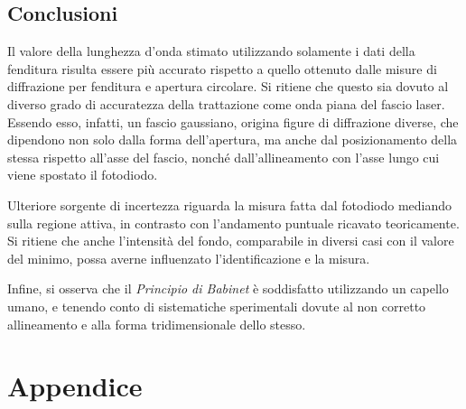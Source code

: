 \documentclass[10pt,oneside,a4paper]{article}
\begin{document}
\begin{multicols}{2}
\section{Conclusioni}
Il valore della lunghezza d'onda stimato utilizzando solamente i dati della fenditura risulta essere più accurato rispetto a quello ottenuto dalle misure di diffrazione per fenditura e apertura circolare. Si ritiene che questo sia dovuto al diverso grado di accuratezza della trattazione come onda piana del fascio laser. Essendo esso, infatti, un fascio gaussiano, origina figure di diffrazione diverse, che dipendono non solo dalla forma dell'apertura, ma anche dal posizionamento della stessa rispetto all'asse del fascio, nonché dall'allineamento con l'asse lungo cui viene spostato il fotodiodo.

Ulteriore sorgente di incertezza riguarda la misura fatta dal fotodiodo mediando sulla regione attiva, in contrasto con l'andamento puntuale ricavato teoricamente. Si ritiene che anche l'intensità del fondo, comparabile in diversi casi con il valore del minimo, possa averne influenzato l'identificazione e la misura.

Infine, si osserva che il \emph{Principio di Babinet} è soddisfatto utilizzando un capello umano, e tenendo conto di sistematiche sperimentali dovute al non corretto allineamento e alla forma tridimensionale dello stesso.





\end{multicols}


\newpage
\section{Appendice}
\end{document}
